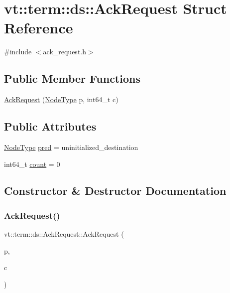 \hypertarget{structvt_1_1term_1_1ds_1_1_ack_request}{}\section{vt\+:\+:term\+:\+:ds\+:\+:Ack\+Request Struct Reference}
\label{structvt_1_1term_1_1ds_1_1_ack_request}


{\ttfamily \#include $<$ack\+\_\+request.\+h$>$}

\subsection*{Public Member Functions}
\begin{DoxyCompactItemize}
\item 
\hyperlink{structvt_1_1term_1_1ds_1_1_ack_request_a560c5b31832454ac8c6a06366c4efc09}{Ack\+Request} (\hyperlink{namespacevt_a866da9d0efc19c0a1ce79e9e492f47e2}{Node\+Type} p, int64\+\_\+t c)
\end{DoxyCompactItemize}
\subsection*{Public Attributes}
\begin{DoxyCompactItemize}
\item 
\hyperlink{namespacevt_a866da9d0efc19c0a1ce79e9e492f47e2}{Node\+Type} \hyperlink{structvt_1_1term_1_1ds_1_1_ack_request_afb3bc50a132952ca60f0652c0396a6ac}{pred} = uninitialized\+\_\+destination
\item 
int64\+\_\+t \hyperlink{structvt_1_1term_1_1ds_1_1_ack_request_adc7efe7df809adf8b7cefeb121509e5e}{count} = 0
\end{DoxyCompactItemize}


\subsection{Constructor \& Destructor Documentation}
\mbox{\label{structvt_1_1term_1_1ds_1_1_ack_request_a560c5b31832454ac8c6a06366c4efc09}} 
\subsubsection{\texorpdfstring{Ack\+Request()}{AckRequest()}}
{\footnotesize\ttfamily vt\+::term\+::ds\+::\+Ack\+Request\+::\+Ack\+Request (\begin{DoxyParamCaption}\item[{\hyperlink{namespacevt_a866da9d0efc19c0a1ce79e9e492f47e2}{Node\+Type}}]{p,  }\item[{int64\+\_\+t}]{c }\end{DoxyParamCaption})\hspace{0.3cm}{\ttfamily [inline]}}



